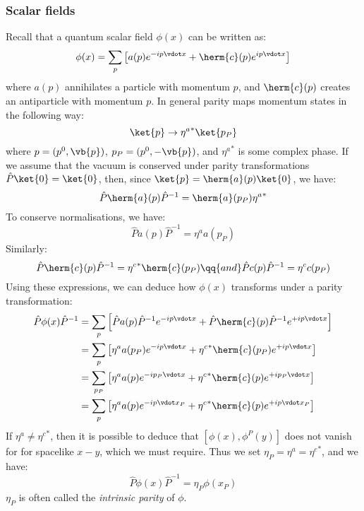 \documentclass{jknotes}
\begin{document}
\subsubsection*{Scalar fields}
Recall that a quantum scalar field \(\phi(x)\) can be written as:
\begin{equation}
    \phi(x) = \sum_p\left[ a(p)e^{-ip\vdot x} + \herm{c}(p)e^{ip\vdot x} \right]
\end{equation}
where \(a(p)\) annihilates a particle with momentum \(p\), and \(\herm{c}(p)\) creates an antiparticle with momentum \(p\). In general parity maps momentum states in the following way:
\begin{equation}
    \ket{p}\rightarrow{\eta^a}^*\ket{p_P}
\end{equation}
where \(p = (p^0,\vb{p})\), \(p_P = (p^0,-\vb{p})\), and \({\eta^a}^*\) is some complex phase. If we assume that the vacuum is conserved under parity transformations \(\hat{P}\ket{0} = \ket{0}\), then, since \(\ket{p}=\herm{a}(p)\ket{0}\), we have:
\begin{equation}
    \hat{P}\herm{a}(p)\hat{P}^{-1} = \herm{a}(p_P){\eta^a}^*
\end{equation}
To conserve normalisations, we have:
\begin{equation}
    \hat{P}a(p)\hat{P}^{-1} = \eta^a a(p_P)
\end{equation}
Similarly:
\begin{equation}
    \hat{P}\herm{c}(p)\hat{P}^{-1} = {\eta^c}^* \herm{c}(p_P)
    \qq{and}
    \hat{P}c(p)\hat{P}^{-1} = \eta^c c(p_P)
\end{equation}
Using these expressions, we can deduce how \(\phi(x)\) transforms under a parity transformation:
\begin{align}
    \hat{P}\phi(x)\hat{P}^{-1} 
    &= \sum_p \left[ \hat{P}a(p)\hat{P}^{-1}e^{-ip\vdot x} + \hat{P}\herm{c}(p)\hat{P}^{-1}e^{+ip\vdot x} \right] \\
    &= \sum_p \left[ \eta^aa(p_P)e^{-ip\vdot x} + {\eta^c}^*\herm{c}(p_P)e^{+ip\vdot x} \right] \\
    &= \sum_{p_P} \left[ \eta^aa(p)e^{-ip_P\vdot x} + {\eta^c}^*\herm{c}(p)e^{+ip_P\vdot x} \right] \\
    &= \sum_p \left[ \eta^aa(p)e^{-ip\vdot x_P} + {\eta^c}^*\herm{c}(p)e^{+ip\vdot x_P} \right] \\
\end{align}
If \(\eta^a \ne {\eta^c}^*\), then it is possible to deduce that \([\phi(x),\phi^P(y)]\) does not vanish for for spacelike \(x-y\), which we must require. Thus we set \(\eta_P = \eta^a = {\eta^c}^*\), and we have:
\begin{equation}
    \hat{P}\phi(x)\hat{P}^{-1} = \eta_P\phi(x_P)
\end{equation}
\(\eta_P\) is often called the \emph{intrinsic parity} of \(\phi\).
\end{document}
